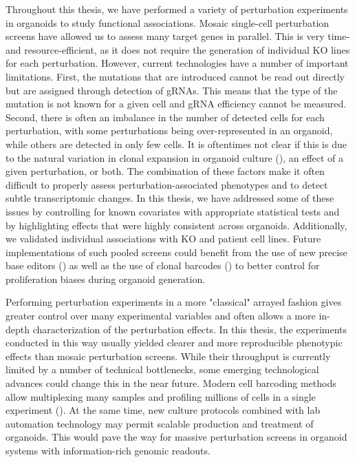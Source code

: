 Throughout this thesis, we have performed a variety of perturbation experiments in organoids to study functional associations. Mosaic single-cell perturbation screens have allowed us to assess many target genes in parallel. This is very time- and resource-efficient, as it does not require the generation of individual KO lines for each perturbation. However, current technologies have a number of important limitations. First, the mutations that are introduced cannot be read out directly but are assigned through detection of gRNAs. This means that the type of the mutation is not known for a given cell and gRNA efficiency cannot be measured. Second, there is often an imbalance in the number of detected cells for each perturbation, with some perturbations being over-represented in an organoid, while others are detected in only few cells. It is oftentimes not clear if this is due to the natural variation in clonal expansion in organoid culture (\cite{esk_human_2020}), an effect of a given perturbation, or both. The combination of these factors make it often difficult to properly assess perturbation-associated phenotypes and to detect subtle transcriptomic changes. In this thesis, we have addressed some of these issues by controlling for known covariates with appropriate statistical tests and by highlighting effects that were highly consistent across organoids. Additionally, we validated individual associations with KO and patient cell lines. Future implementations of such pooled screens could benefit from the use of new precise base editors (\cite{anzalone_search-and-replace_2019}) as well as the use of clonal barcodes (\cite{he_lineage_2022,esk_human_2020}) to better control for proliferation biases during organoid generation. 

Performing perturbation experiments in a more "classical" arrayed fashion gives greater control over many experimental variables and often allows a more in-depth characterization of the perturbation effects. In this thesis, the experiments conducted in this way usually yielded clearer and more reproducible phenotypic effects than mosaic perturbation screens. While their throughput is currently limited by a number of technical bottlenecks, some emerging technological advances could change this in the near future. Modern cell barcoding methods allow multiplexing many samples and profiling millions of cells in a single experiment (\cite{rosenberg_single-cell_2018,yin_high-throughput_2019,cao_comprehensive_2017}). At the same time, new culture protocols combined with lab automation technology may permit scalable production and treatment of organoids. This would pave the way for massive perturbation screens in organoid systems with information-rich genomic readouts. 


